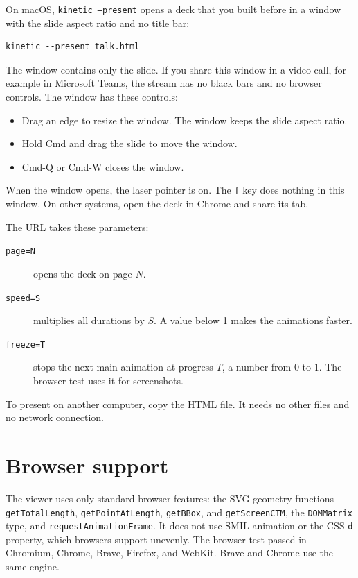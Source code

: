 \documentclass[11pt]{article}
\newcommand{\cmd}[1]{\texttt{#1}}
\begin{document}
On macOS, \cmd{kinetic --present} opens a deck that you built before in a window
with the slide aspect ratio and no title bar:
\begin{lstlisting}
kinetic --present talk.html
\end{lstlisting}
The window contains only the slide. If you share this window in a video call, for
example in Microsoft Teams, the stream has no black bars and no browser controls.
The window has these controls:
\begin{itemize}
	\item Drag an edge to resize the window. The window keeps the slide aspect
	      ratio.
	\item Hold Cmd and drag the slide to move the window.
	\item Cmd-Q or Cmd-W closes the window.
\end{itemize}
When the window opens, the laser pointer is on. The \cmd{f} key does nothing in
this window. On other systems, open the deck in Chrome and share its tab.

The URL takes these parameters:
\begin{description}
	\item[\cmd{page=N}] opens the deck on page $N$.
	\item[\cmd{speed=S}] multiplies all durations by $S$. A value below 1 makes the
	      animations faster.
	\item[\cmd{freeze=T}] stops the next main animation at progress $T$, a number
	      from 0 to 1. The browser test uses it for screenshots.
\end{description}

To present on another computer, copy the HTML file. It needs no other files and
no network connection.

\section{Browser support}

\begin{sloppypar}
	The viewer uses only standard browser features: the SVG geometry functions
	\cmd{getTotalLength}, \cmd{getPointAtLength}, \cmd{getBBox}, and
	\cmd{getScreenCTM}, the \cmd{DOMMatrix} type, and \cmd{requestAnimationFrame}. It
	does not use SMIL animation or the CSS \cmd{d} property, which browsers support
	unevenly. The browser test passed in Chromium, Chrome, Brave, Firefox, and WebKit.
	Brave and Chrome use the same engine.
\end{sloppypar}
\end{document}
